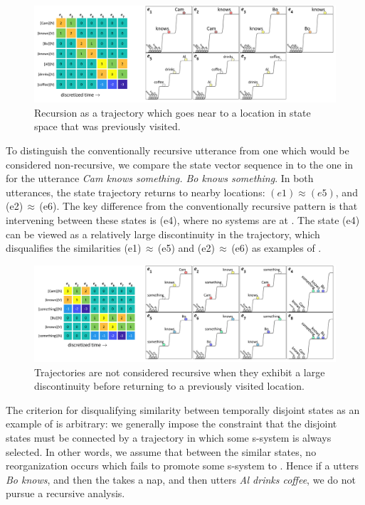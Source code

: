  
\begin{figure}
\includegraphics[width=\textwidth]{figures/Tilsen-img112.png}
\caption{Recursion as a trajectory which goes near to a location in state space that was previously visited.}
\label{fig:5:8}
\end{figure}
 

  To distinguish the conventionally recursive utterance from one which would be considered non-recursive, we compare the state vector sequence in {} to the one in {} for the utterance \textit{Cam knows something. Bo knows something}. In both utterances, the state trajectory returns to nearby locations: $(e1) \approx\allowbreak (e5)$, and (e2)\,${\approx}$\,(e6). The key difference from the conventionally recursive pattern is that intervening between these states is (e4), where no systems are at . The state (e4) can be viewed as a relatively large discontinuity in the  trajectory, which disqualifies the similarities (e1)\,${\approx}$\,(e5) and (e2)\,${\approx}$\,(e6) as examples of .

  
\begin{figure}
\includegraphics[width=\textwidth]{figures/Tilsen-img113.png}
\caption{Trajectories are not considered recursive when they exhibit a large discontinuity before returning to a previously visited location.}
\label{fig:5:9}
\end{figure}
 

  The criterion for disqualifying similarity between temporally disjoint states as an example of  is arbitrary: we generally impose the constraint that the disjoint states must be connected by a trajectory in which some s-sys\-tem is always selected. In other words, we assume that between the similar states, no reorganization occurs which fails to promote some s-sys\-tem to . Hence if a  utters \textit{Bo knows}, and then the  takes a nap, and then utters \textit{Al drinks coffee}, we do not pursue a recursive analysis. 


